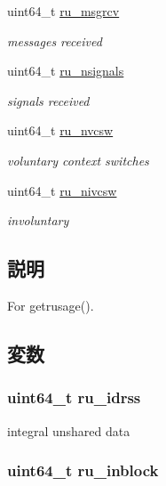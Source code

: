 \begin{DoxyCompactItemize}
uint64\_\-t \hyperlink{structTru64_1_1rusage_ae145f05fe8148c6170f11f2acd9f16bb}{ru\_\-msgrcv}
\begin{DoxyCompactList}\small\item\em messages received \item\end{DoxyCompactList}\item 
uint64\_\-t \hyperlink{structTru64_1_1rusage_aaed29750e3c746e4666278d303109511}{ru\_\-nsignals}
\begin{DoxyCompactList}\small\item\em signals received \item\end{DoxyCompactList}\item 
uint64\_\-t \hyperlink{structTru64_1_1rusage_aa283058b4b95b6777b3beb03ebaae43a}{ru\_\-nvcsw}
\begin{DoxyCompactList}\small\item\em voluntary context switches \item\end{DoxyCompactList}\item 
uint64\_\-t \hyperlink{structTru64_1_1rusage_aa9e3584d4779e36f0479719f187b7c96}{ru\_\-nivcsw}
\begin{DoxyCompactList}\small\item\em involuntary  \item\end{DoxyCompactList}\end{DoxyCompactItemize}


\subsection{説明}
For getrusage(). 

\subsection{変数}
\hypertarget{structTru64_1_1rusage_a3bcd09d2a9febd230bd9f391e3fd81e9}{
\subsubsection[{ru\_\-idrss}]{\setlength{\rightskip}{0pt plus 5cm}uint64\_\-t {\bf ru\_\-idrss}}}
\label{structTru64_1_1rusage_a3bcd09d2a9febd230bd9f391e3fd81e9}


integral unshared data  \hypertarget{structTru64_1_1rusage_a1ee829a3685f9d009c73b1f1a8aa8955}{
\subsubsection[{ru\_\-inblock}]{\setlength{\rightskip}{0pt plus 5cm}uint64\_\-t {\bf ru\_\-inblock}}}
\label{structTru64_1_1rusage_a1ee829a3685f9d009c73b1f1a8aa8955}


